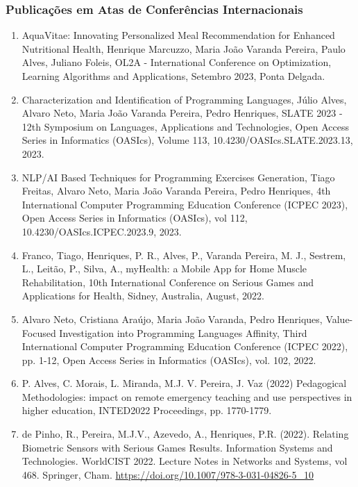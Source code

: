 \documentclass[11pt]{article}
\begin{document}
\subsubsection{Publicações em Atas de Conferências Internacionais}
\begin{enumerate}

\item {AquaVitae: Innovating Personalized Meal Recommendation for Enhanced Nutritional Health, Henrique Marcuzzo, Maria João Varanda Pereira, Paulo Alves, Juliano Foleis, OL2A - International Conference on Optimization, Learning Algorithms and Applications, Setembro 2023, Ponta Delgada.}

\item {Characterization and Identification of Programming Languages, Júlio Alves, Alvaro Neto, Maria João Varanda Pereira, Pedro Henriques, SLATE 2023 - 12th Symposium on Languages, Applications and Technologies, Open Access Series in Informatics (OASIcs), Volume 113, 10.4230/OASIcs.SLATE.2023.13, 2023.}

\item {NLP/AI Based Techniques for Programming Exercises Generation, Tiago Freitas, Alvaro Neto, Maria João Varanda Pereira, Pedro Henriques, 4th International Computer Programming Education Conference (ICPEC 2023), Open Access Series in Informatics (OASIcs), vol 112, 10.4230/OASIcs.ICPEC.2023.9, 2023.}

\item {Franco, Tiago, Henriques, P. R., Alves, P., Varanda Pereira, M. J., Sestrem, L., Leitão, P., Silva, A., myHealth: a Mobile App for Home Muscle Rehabilitation, 10th International Conference on Serious Games and Applications for Health, Sidney, Australia, August, 2022. }

\item {Alvaro Neto, Cristiana Araújo, Maria João Varanda, Pedro Henriques, Value-Focused Investigation into Programming Languages Affinity, Third International Computer Programming Education Conference (ICPEC 2022), pp. 1-12, Open Access Series in Informatics (OASIcs), vol. 102, 2022. }

\item {P. Alves, C. Morais, L. Miranda, M.J. V. Pereira, J. Vaz (2022) Pedagogical Methodologies: impact on remote emergency teaching and use perspectives in higher education, INTED2022 Proceedings, pp. 1770-1779. }

\item {de Pinho, R., Pereira, M.J.V., Azevedo, A., Henriques, P.R. (2022). Relating Biometric Sensors with Serious Games Results. Information Systems and Technologies. WorldCIST 2022. Lecture Notes in Networks and Systems, vol 468. Springer, Cham. \url{https://doi.org/10.1007/978-3-031-04826-5_10} }


\end{enumerate}
\end{document}
